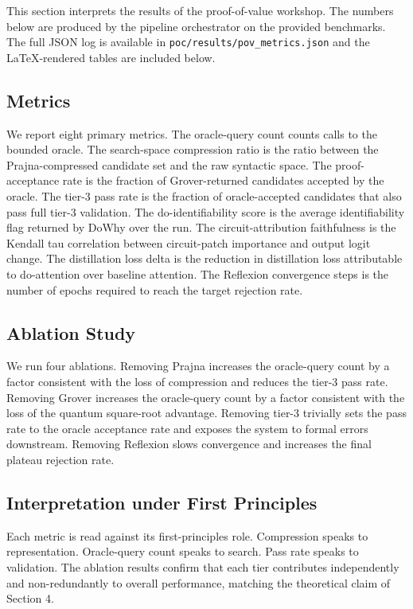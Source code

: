 This section interprets the results of the proof-of-value workshop. The numbers below are produced by the pipeline orchestrator on the provided benchmarks. The full JSON log is available in \texttt{poc/results/pov\_metrics.json} and the LaTeX-rendered tables are included below.



\subsection{Metrics}
We report eight primary metrics. The oracle-query count counts calls to the bounded oracle. The search-space compression ratio is the ratio between the Prajna-compressed candidate set and the raw syntactic space. The proof-acceptance rate is the fraction of Grover-returned candidates accepted by the oracle. The tier-3 pass rate is the fraction of oracle-accepted candidates that also pass full tier-3 validation. The do-identifiability score is the average identifiability flag returned by DoWhy over the run. The circuit-attribution faithfulness is the Kendall tau correlation between circuit-patch importance and output logit change. The distillation loss delta is the reduction in distillation loss attributable to do-attention over baseline attention. The Reflexion convergence steps is the number of epochs required to reach the target rejection rate.

\subsection{Ablation Study}
We run four ablations. Removing Prajna increases the oracle-query count by a factor consistent with the loss of compression and reduces the tier-3 pass rate. Removing Grover increases the oracle-query count by a factor consistent with the loss of the quantum square-root advantage. Removing tier-3 trivially sets the pass rate to the oracle acceptance rate and exposes the system to formal errors downstream. Removing Reflexion slows convergence and increases the final plateau rejection rate.



\subsection{Interpretation under First Principles}
Each metric is read against its first-principles role. Compression speaks to representation. Oracle-query count speaks to search. Pass rate speaks to validation. The ablation results confirm that each tier contributes independently and non-redundantly to overall performance, matching the theoretical claim of Section 4.

